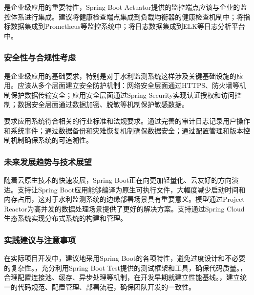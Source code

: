 是企业级应用的重要特性，Spring Boot Actuator提供的监控端点应该与企业的监控体系进行集成。建议将健康检查端点集成到负载均衡器的健康检查机制中；将指标数据集成到Prometheus等监控系统中；将日志数据集成到ELK等日志分析平台中。

\hypertarget{ux5b89ux5168ux6027ux4e0eux5408ux89c4ux6027ux8003ux8651}{%
\subsubsection{安全性与合规性考虑}\label{ux5b89ux5168ux6027ux4e0eux5408ux89c4ux6027ux8003ux8651}}

是企业级应用的基础要求，特别是对于水利监测系统这样涉及关键基础设施的应用。应该从多个层面建立安全防护机制：网络安全层面通过HTTPS、防火墙等机制保护数据传输安全；应用安全层面通过Spring Security实现认证授权和访问控制；数据安全层面通过数据加密、脱敏等机制保护敏感数据。

要求应用系统符合相关的行业标准和法规要求。通过完善的审计日志记录用户操作和系统事件；通过数据备份和灾难恢复机制确保数据安全；通过配置管理和版本控制机制确保系统的可追溯性。

\hypertarget{ux672aux6765ux53d1ux5c55ux8d8bux52bfux4e0eux6280ux672fux5c55ux671b}{%
\subsubsection{未来发展趋势与技术展望}\label{ux672aux6765ux53d1ux5c55ux8d8bux52bfux4e0eux6280ux672fux5c55ux671b}}

随着云原生技术的快速发展，Spring Boot正在向更加轻量化、云友好的方向演进。支持让Spring Boot应用能够编译为原生可执行文件，大幅度减少启动时间和内存占用，这对于水利监测系统的边缘部署场景具有重要意义。模型通过Project Reactor为高并发的数据处理场景提供了更好的解决方案。支持通过Spring Cloud生态系统实现分布式系统的构建和管理。

\hypertarget{ux5b9eux8df5ux5efaux8baeux4e0eux6ce8ux610fux4e8bux9879}{%
\subsubsection{实践建议与注意事项}\label{ux5b9eux8df5ux5efaux8baeux4e0eux6ce8ux610fux4e8bux9879}}

在实际项目开发中，建议地采用Spring Boot的各项特性，避免过度设计和不必要的复杂性。，充分利用Spring Boot Test提供的测试框架和工具，确保代码质量。，合理配置连接池、缓存、异步处理等机制，在开发早期就建立性能基线。，建立统一的代码规范、配置管理、部署流程，确保团队开发的一致性。

